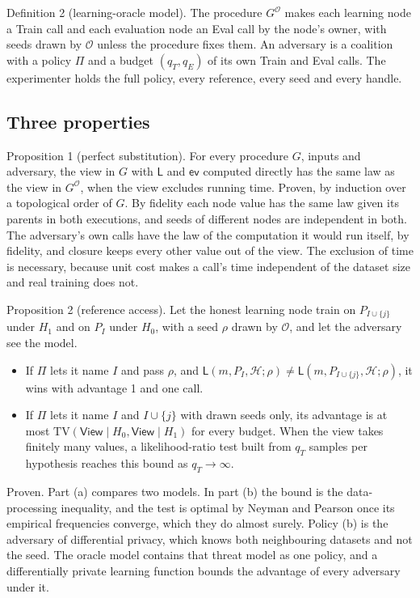 \documentclass{labreport}
\newcommand{\Hc}{\mathcal{H}}
\newcommand{\Lf}{\mathsf{L}}
\newcommand{\ev}{\mathsf{ev}}
\newcommand{\Or}{\mathcal{O}}
\newcommand{\View}{\mathsf{View}}
\newcommand{\TV}{\mathrm{TV}}
\newcommand{\call}[1]{\textsf{#1}}
\begin{document}
Definition 2 (learning-oracle model). The procedure $G^{\Or}$ makes each learning
node a \call{Train} call and each evaluation node an \call{Eval} call by the
node's owner, with seeds drawn by $\Or$ unless the procedure fixes them. An
adversary is a coalition with a policy $\Pi$ and a budget $(q_T,q_E)$ of its own
\call{Train} and \call{Eval} calls. The experimenter holds the full policy,
every reference, every seed and every handle.

\subsection*{Three properties}
Proposition 1 (perfect substitution). For every procedure $G$, inputs and
adversary, the view in $G$ with $\Lf$ and $\ev$ computed directly has the same
law as the view in $G^{\Or}$, when the view excludes running time. Proven, by
induction over a topological order of $G$. By fidelity each node value has the same
law given its parents in both executions, and seeds of different nodes are
independent in both. The adversary's own calls have the law of the computation
it would run itself, by fidelity, and closure keeps every other value out of the view. The
exclusion of time is necessary, because unit cost makes a call's time independent of
the dataset size and real training does not.

Proposition 2 (reference access). Let the honest learning node train on
$P_{I\cup\{j\}}$ under $H_1$ and on $P_I$ under $H_0$, with a seed $\rho$ drawn
by $\Or$, and let the adversary see the model.
\begin{itemize}
\item[(a)] If $\Pi$ lets it name $I$ and pass $\rho$, and
  $\Lf(m,P_I,\Hc;\rho)\neq\Lf(m,P_{I\cup\{j\}},\Hc;\rho)$, it wins with advantage
  1 and one call.
\item[(b)] If $\Pi$ lets it name $I$ and $I\cup\{j\}$ with drawn seeds only, its
  advantage is at most $\TV(\View\mid H_0,\View\mid H_1)$ for every budget. When
  the view takes finitely many values, a likelihood-ratio test built from
  $q_T$ samples per hypothesis reaches this bound as $q_T\to\infty$.
\end{itemize}
Proven. Part (a) compares two models. In part (b) the bound is the
data-processing inequality, and the test is optimal by Neyman and Pearson once
its empirical frequencies converge, which they do almost surely. Policy (b) is
the adversary of differential privacy, which knows both neighbouring datasets
and not the seed. The oracle model contains that threat model as one policy, and
a differentially private learning function bounds the advantage of every
adversary under it.
\end{document}
